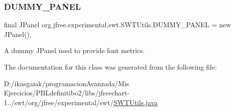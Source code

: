 \subsubsection{\texorpdfstring{D\+U\+M\+M\+Y\+\_\+\+P\+A\+N\+EL}{DUMMY\_PANEL}}
{\footnotesize\ttfamily final J\+Panel org.\+jfree.\+experimental.\+swt.\+S\+W\+T\+Utils.\+D\+U\+M\+M\+Y\+\_\+\+P\+A\+N\+EL = new J\+Panel()\hspace{0.3cm}{\ttfamily [static]}, {\ttfamily [protected]}}

A dummy J\+Panel used to provide font metrics. 

The documentation for this class was generated from the following file\+:\begin{DoxyCompactItemize}
\item 
D\+:/ikasgaiak/programacion\+Avanzada/\+Mis Ejercicios/\+P\+B\+Ldefinitibo2/libs/jfreechart-\/1../swt/org/jfree/experimental/swt/\mbox{\hyperlink{_s_w_t_utils_8java}{S\+W\+T\+Utils.\+java}}\end{DoxyCompactItemize}

